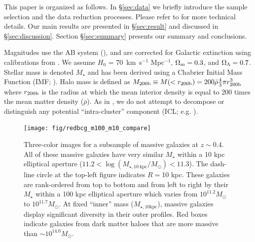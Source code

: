 \documentclass[a4paper,fleqn,usenatbib]{mnras}
\def\redm{\texttt{redMaPPer}}
\def\mstar{{$M_{\star}$}}
\def\minn{{$M_{\star,10\mathrm{kpc}}$}}
\begin{document}
    
    This paper is organized as follows. 
    In \S \ref{sec:data} we briefly introduce the sample selection and the data 
    reduction processes.  
    Please refer to \citet{hscMassiveI} for more technical details.
    Our main results are presented in \S \ref{sec:result} and discussed in 
    \S \ref{sec:discussion}. 
    Section \S \ref{sec:summary} presents our summary and conclusions.

    Magnitudes use the AB system (\citealt{Oke1983}), and are corrected for Galactic 
    extinction using calibrations from \citet{Schlafly11}. 
    We assume $H_0$ = 70~km~s$^{-1}$ Mpc$^{-1}$, ${\Omega}_{\rm m}=0.3$, 
    and ${\Omega}_{\rm \Lambda}=0.7$.
    Stellar mass is denoted \mstar{} and has been derived using a Chabrier Initial Mass 
    Function (IMF; \citealt{Chabrier2003}). Halo mass is defined as 
    $M_{\rm 200b}\equiv M(<r_{\rm 200b})=200\bar{\rho} 
    \frac{4}{3}\pi r_{\rm 200b}^3$ where $r_{\rm 200b}$
    is the radius at which the mean interior density is equal to 200 times
    the mean matter density ($\bar{\rho}$). 
    As in \citet{hscMassiveI}, we do not attempt to decompose or distinguish any  
    potential ``intra-cluster'' 
    component (ICL; e.g. \citealt{Carlberg1997, Lin2004, Gonzalez2005, Mihos2005}). 
    

  \begin{figure}
      \centering 
      \texttt{[image: fig/redbcg\_m100\_m10\_compare]}
      \caption{
          Three-color images for a subsample of massive galaxies at $z{\sim}0.4$. 
          All of these massive galaxies have very similar \mstar{} within a 10 kpc 
          elliptical aperture 
          ($11.2<\log (M_{\star,10\ \mathrm{kpc}}/M_{\odot})<11.3$). 
          The dash-line circle at the top-left figure indicates $R=$10 kpc.
          These galaxies are rank-ordered from top to bottom and from left to right 
          by their \mstar{} within a 100 kpc elliptical aperture which varies 
          from $10^{11.2} M_{\odot}$ to $10^{11.7} M_{\odot}$. 
          At fixed ``inner'' mass (\minn{}), massive galaxies display significant
          diversity in their outer profiles. 
          Red boxes indicate galaxies from dark matter haloes that are more massive 
          than ${\sim} 10^{14.0} M_{\odot}$. 
          }
      \label{fig:m100_m10_color}
  \end{figure}
\end{document}
